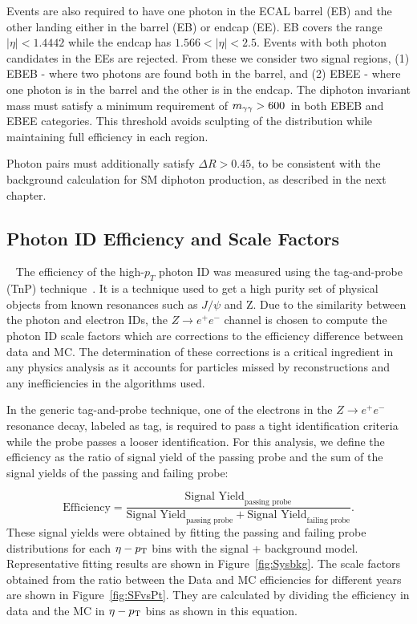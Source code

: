 Events are also required to have one photon in the ECAL barrel (EB) and the other landing either in the barrel (EB) or endcap (EE). EB covers the range $|\eta| < 1.4442$ while the endcap has $1.566 < |\eta| < 2.5$. Events with both photon candidates in the EEs are rejected. From these we consider two signal regions, (1) EBEB - where two photons are found both in the barrel, and (2) EBEE - where one photon is in the barrel and the other is in the endcap. The diphoton invariant mass must satisfy a minimum requirement of $m_{\gamma\gamma}>600$~\GeV in both EBEB and EBEE categories. This threshold avoids sculpting of the distribution while maintaining full efficiency in each region. 

Photon pairs must additionally satisfy $\Delta R> 0.45$, to be consistent with the background calculation for SM diphoton production, as described in the next chapter.


\subsection{Photon ID Efficiency and Scale Factors}~\label{selection_efficiency}
The efficiency of the high-$p_{T}$ photon ID was measured using the tag-and-probe (TnP) technique~\cite{generic_TnP}. It is a technique used to get a high purity set of physical objects from known resonances such as $J/\psi$ and Z. Due to the similarity between the photon and electron IDs, the $Z \to e^{+}e^{-}$ channel is chosen to compute the photon ID scale factors which are corrections to the efficiency difference between data and MC. The determination of these corrections is a critical ingredient in any physics analysis as it accounts for particles missed by reconstructions and any inefficiencies in the algorithms used. 

In the generic tag-and-probe technique, one of the electrons in the $Z \to e^{+}e^{-}$ resonance decay, labeled as tag, is required to pass a tight identification criteria while the probe passes a looser identification. For this analysis, we define the efficiency as the ratio of signal yield of the passing probe and the sum of the signal yields of the passing and failing probe:

\begin{equation} \label{eq:efficiency}
  \text{Efficiency} = \frac{\text{Signal Yield}_{\text{passing probe}}}{\text{Signal Yield}_{\text{passing probe}} + \text{Signal Yield}_{\text{failing probe}}}.
\end{equation}
These signal yields were obtained by fitting the passing and failing probe distributions for each $\eta-p_{\mathrm{T}}$ bins with the signal + background model. Representative fitting results are shown in Figure~\ref{fig:Sysbkg}. The scale factors obtained from the ratio between the Data and MC efficiencies for different years are shown in Figure~\ref{fig:SFvsPt}. They are calculated by dividing the efficiency in data and the MC in $\eta-p_{\mathrm{T}}$ bins as shown in this equation. 

